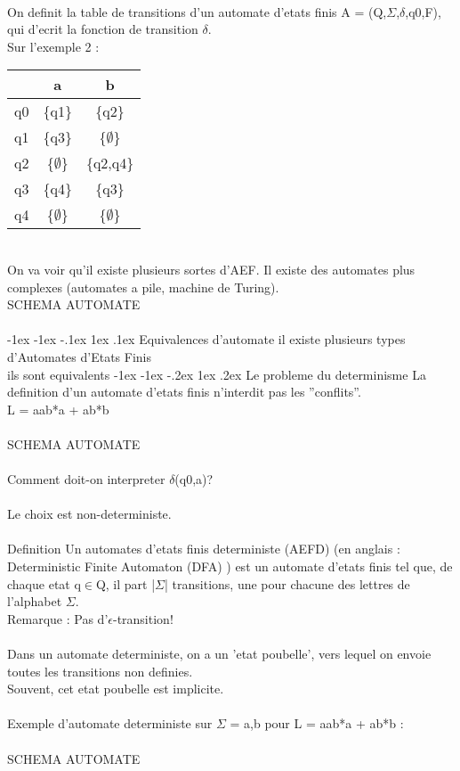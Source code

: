 \documentclass[5pt]{article}
\makeatletter
\renewcommand{\subsubsection}{\@startsection {section}{1}{\z@}%
             {-1ex \@plus -1ex \@minus -.2ex}%
             {1ex \@plus.2ex}%
             {\normalfont\scriptsize\sffamily\bfseries}}
\renewcommand{\subsection}{\@startsection {section}{1}{\z@}%
             {-1ex \@plus -1ex \@minus -.1ex}%
             {1ex \@plus.1ex}%
             {\normalfont\small\sffamily\bfseries}}
\makeatother
\begin{document}
\begin{scriptsize}
\\
On definit la table de transitions d’un automate d’etats finis A = (Q,$\Sigma$,$\delta$,q0,F), qui d'ecrit la fonction de transition $\delta$.\\
Sur l’exemple 2 :\\
\begin{tabular}{|c|c|c|}
\hline
&a & b \\ \hline
q0 &\{q1\} &\{q2\}\\ \hline
q1 &\{q3\} &\{$\emptyset$\}\\ \hline
q2 &\{$\emptyset$\} &\{q2,q4\}\\ \hline
q3 &\{q4\} &\{q3\}\\ \hline
q4 &\{$\emptyset$\} &\{$\emptyset$\}\\\hline
\hline
\end{tabular}
\\
 On va voir qu’il existe plusieurs sortes d’AEF.
 Il existe des automates plus complexes (automates a pile, machine de Turing).
\\
SCHEMA AUTOMATE\\
\\
\subsection{Equivalences d'automate}
il existe plusieurs types d’Automates d’Etats Finis\\
ils sont equivalents
\subsubsection{Le probleme du determinisme}
La definition d’un automate d’etats finis n’interdit pas les ”conflits”.\\
L = aab*a + ab*b\\
\\
SCHEMA AUTOMATE\\
\\
Comment doit-on interpreter $\delta$(q0,a)?\\
\\
Le choix est non-deterministe.\\
\\
Definition Un automates d’etats finis deterministe (AEFD) (en anglais : Deterministic Finite Automaton (DFA) ) est un automate d’etats finis tel que, de chaque etat q$\in$Q, il part |$\Sigma$| transitions, une pour chacune des lettres de l’alphabet $\Sigma$.\\
Remarque : Pas d’$\epsilon$-transition!\\
\\
Dans un automate deterministe, on a un ’etat poubelle’, vers lequel on envoie toutes les transitions non definies.\\
Souvent, cet etat poubelle est implicite.\\
\\
Exemple d’automate deterministe sur $\Sigma$ = {a,b} pour L = aab*a + ab*b :\\
\\
SCHEMA AUTOMATE\\
\\

\end{scriptsize}
\end{document}
